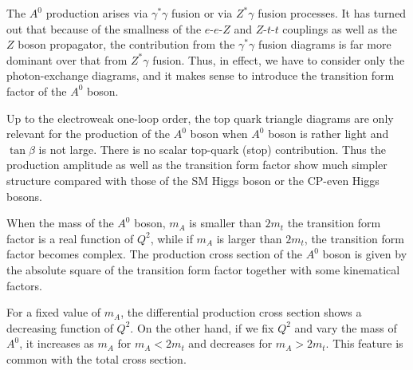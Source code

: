 \documentclass[final,5p,times,twocolumn]{elsarticle}
\begin{document}
The $A^0$ production 
arises via $\gamma^*\gamma$ fusion or via $Z^*\gamma$ fusion processes.
It has turned out that because of the smallness of the $e$-$e$-$Z$ and 
$Z$-$t$-$t$ couplings as well as the $Z$ boson propagator, the contribution 
from the $\gamma^*\gamma$ fusion diagrams is far more dominant over that from 
$Z^*\gamma$ fusion. Thus, in effect,  we  have to consider only the photon-exchange diagrams, 
and it makes sense to introduce the transition form 
factor of the $A^0$ boson.

Up to the electroweak one-loop order,  the top quark  triangle
diagrams are only relevant for the production of the $A^0$ boson 
when $A^0$ boson is rather light and $\tan\beta$ is not large. 
There is no scalar top-quark (stop) contribution.
Thus the production
amplitude as well as the transition form factor show much simpler 
structure compared with those of the SM Higgs boson or the CP-even Higgs
bosons. 

When the mass of the $A^0$ boson, $m_A$ is smaller than $2m_t$ the transition
form factor is a real function of $Q^2$, while if $m_A$ is larger than $2m_t$,
the transition form factor becomes complex. The production cross section of the
$A^0$ boson is given by the absolute square of the transition form
factor together with some kinematical factors.

For a fixed value of $m_A$, the differential production cross section shows
a decreasing function of $Q^2$. On the other hand, if we fix $Q^2$ and vary
the mass of $A^0$, it increases as $m_A$ for $m_A<2m_t$ and decreases for
$m_A>2m_t$. This feature is common with the total cross section.


\end{document}
